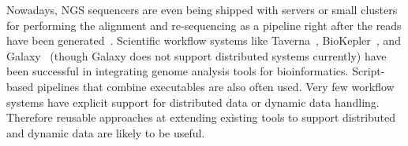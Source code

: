 Nowadays, NGS sequencers are even being shipped with servers or small
clusters for performing the alignment and re-sequencing as a pipeline
right after the reads have been generated~\cite{ilm}.
%
Scientific workflow systems like Taverna~\cite{Taverna:2006}, BioKepler~\cite{biokepler:2011}, and
Galaxy~\cite{galaxy} (though Galaxy does not support distributed systems currently) have been successful in integrating genome
analysis tools for bioinformatics. Script-based pipelines that combine
executables are also often used. Very few workflow systems have
explicit support for distributed data or dynamic data handling.
Therefore reusable approaches at extending existing tools to support
distributed and dynamic data are likely to be useful.


%









